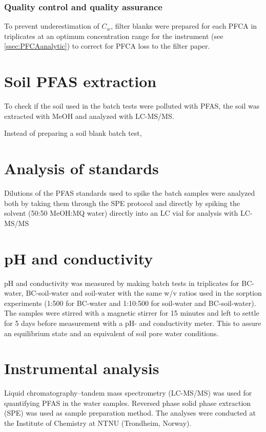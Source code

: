 \subsubsection{Quality control and quality assurance}
To prevent underestimation of $C_w$, filter blanks were prepared for each PFCA in triplicates at an optimum concentration range for the instrument (see \cref{ssec:PFCAanalytic}) to correct for PFCA loss to the filter paper. 
\section{Soil PFAS extraction}
To check if the soil used in the batch tests were polluted with PFAS, the soil was extracted with MeOH and analyzed with LC-MS/MS. 

Instead of preparing a soil blank batch test,
\section{Analysis of standards}
Dilutions of the PFAS standards used to spike the batch samples were analyzed both by taking them through the SPE protocol and directly by spiking the solvent (50:50 MeOH:MQ water) directly into an LC vial for analysis with LC-MS/MS 

\section{pH and conductivity}
pH and conductivity was measured by making batch tests in triplicates for BC-water, BC-soil-water and soil-water with the same w/v ratios used in the sorption experiments (1:500 for BC-water and 1:10:500 for soil-water and BC-soil-water). The samples were stirred with a magnetic stirrer for 15 minutes and left to settle for 5 days before measurement with a pH- and conductivity meter. This to assure an equilibrium state and an equivalent of soil pore water conditions.


\section{Instrumental analysis}
Liquid chromatography--tandem mass spectrometry (LC-MS/MS) was used for quantifying PFAS in the water samples. Reversed phase solid phase extraction (SPE) was used as sample preparation method. The analyses were conducted at the Institute of Chemistry at NTNU (Trondheim, Norway).

